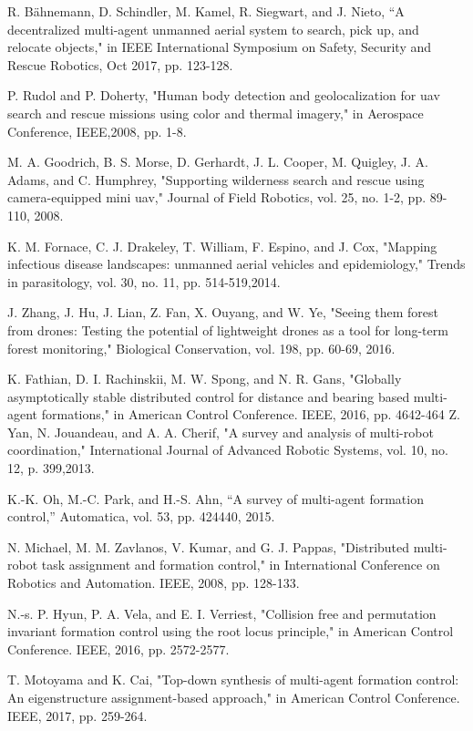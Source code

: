 \documentclass[10pt]{article}
\begin{document}
R. Bähnemann, D. Schindler, M. Kamel, R. Siegwart, and J. Nieto, “A decentralized multi-agent unmanned aerial system to search, pick up, and relocate objects," in IEEE International Symposium on Safety, Security and Rescue Robotics, Oct 2017, pp. 123-128.

P. Rudol and P. Doherty, "Human body detection and geolocalization for uav search and rescue missions using color and thermal imagery," in Aerospace Conference, IEEE,2008, pp. 1-8.

M. A. Goodrich, B. S. Morse, D. Gerhardt, J. L. Cooper, M. Quigley, J. A. Adams, and C. Humphrey, "Supporting wilderness search and rescue using camera-equipped mini uav," Journal of Field Robotics, vol. 25, no. 1-2, pp. 89-110, 2008.

K. M. Fornace, C. J. Drakeley, T. William, F. Espino, and J. Cox, "Mapping infectious disease landscapes: unmanned aerial vehicles and epidemiology," Trends in parasitology, vol. 30, no. 11, pp. 514-519,2014.

J. Zhang, J. Hu, J. Lian, Z. Fan, X. Ouyang, and W. Ye, "Seeing them forest from drones: Testing the potential of lightweight drones as a tool for long-term forest monitoring," Biological Conservation, vol. 198, pp. 60-69, 2016.

K. Fathian, D. I. Rachinskii, M. W. Spong, and N. R. Gans, "Globally asymptotically stable distributed control for distance and bearing based multi-agent formations," in American Control Conference. IEEE, 2016, pp. 4642-464 Z. Yan, N. Jouandeau, and A. A. Cherif, "A survey and analysis of multi-robot coordination," International Journal of Advanced Robotic Systems, vol. 10, no. 12, p. 399,2013.

K.-K. Oh, M.-C. Park, and H.-S. Ahn, “A survey of multi-agent formation control,” Automatica, vol. 53, pp. 424440, 2015.

N. Michael, M. M. Zavlanos, V. Kumar, and G. J. Pappas, "Distributed multi-robot task assignment and formation control," in International Conference on Robotics and Automation. IEEE, 2008, pp. 128-133.

N.-s. P. Hyun, P. A. Vela, and E. I. Verriest, "Collision free and permutation invariant formation control using the root locus principle," in American Control Conference. IEEE, 2016, pp. 2572-2577.

T. Motoyama and K. Cai, "Top-down synthesis of multi-agent formation control: An eigenstructure assignment-based approach," in American Control Conference. IEEE, 2017, pp. 259-264.
\end{document}
